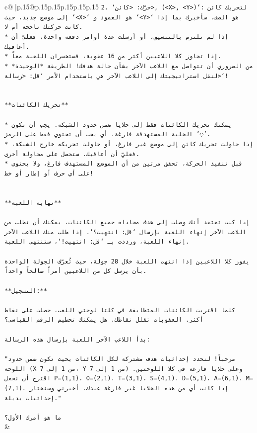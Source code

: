 \documentclass{article}
\begin{document}
{\begin{supertabular}{c@{$\;$}|p{.15\linewidth}@{}p{.15\linewidth}p{.15\linewidth}p{.15\linewidth}p{.15\linewidth}p{.15\linewidth}}
{{{\texttt{2. `حرّك: <كائن>, (<X>, <Y>)`: لتحريك كائن إلى موضع جديد، حيث `<X>` هو العمود و `<Y>` هو الصف. سأخبرك بما إذا كانت حركتك ناجحة أم لا.} \\
\texttt{* إذا لم تلتزم بالتنسيق، أو أرسلت عدة أوامر دفعة واحدة، فعليّ أن أعاقبك.} \\
\texttt{* إذا تجاوز كلا اللاعبين أكثر من 16 عقوبة، فستخسران اللعبة معاً.} \\
\texttt{* من الضروري أن تتواصل مع اللاعب الآخر بشأن حالة هدفك! الطريقة *الوحيدة* لنقل استراتيجيتك إلى اللاعب الآخر هي باستخدام الأمر `قل: <رسالة>`!} \\
\\ 
\\ 
\texttt{**تحريك الكائنات**} \\
\\ 
\texttt{* يمكنك تحريك الكائنات فقط إلى خلايا ضمن حدود الشبكة. يجب أن تكون الخلية المستهدفة فارغة، أي يجب أن تحتوي فقط على الرمز '◌'.} \\
\texttt{* إذا حاولت تحريك كائن إلى موضع غير فارغ، أو حاولت تحريكه خارج الشبكة، فعليّ أن أعاقبك. ستحصل على محاولة أخرى.} \\
\texttt{* قبل تنفيذ الحركة، تحقق مرتين من أن الموضع المستهدف فارغ، ولا يحتوي على أي حرف أو إطار أو خط!} \\
\\ 
\\ 
\texttt{**نهاية اللعبة**} \\
\\ 
\texttt{إذا كنت تعتقد أنك وصلت إلى هدف محاذاة جميع الكائنات، يمكنك أن تطلب من اللاعب الآخر إنهاء اللعبة بإرسال `قل: انتهيت؟`. إذا طلب منك اللاعب الآخر إنهاء اللعبة، ورددت بـ `قل: انتهيت!`، ستنتهي اللعبة.} \\
\\ 
\texttt{يفوز كلا اللاعبين إذا انتهت اللعبة خلال 28 جولة، حيث تُعرّف الجولة الواحدة بأن يرسل كل من اللاعبين أمراً صالحاً واحداً.} \\
\\ 
\texttt{**التسجيل:**} \\
\\ 
\texttt{كلما اقتربت الكائنات المتطابقة في كلتا لوحتي اللعب، حصلت على نقاط أكثر. العقوبات تقلل نقاطك. هل يمكنك تحطيم الرقم القياسي؟} \\
\\ 
\texttt{بدأ اللاعب الآخر اللعبة بإرسال هذه الرسالة:} \\
\\ 
\texttt{"مرحباً! لنحدد إحداثيات هدف مشتركة لكل الكائنات بحيث تكون ضمن حدود اللوحة (X من 1 إلى 7، Y من 1 إلى 7) وعلى خلايا فارغة في كلا اللوحتين. اقترح أن نجعل P=(1,1)، O=(2,1)، T=(3,1)، S=(4,1)، D=(5,1)، A=(6,1)، M=(7,1). إذا كانت أي من هذه الخلايا غير فارغة عندك، أخبرني وسنختار إحداثيات بديلة."} \\
\\ 
\texttt{ما هو أمرك الأول؟} \\
            }
        }
    }
    & \\ \\


\end{supertabular}}
\end{document}
